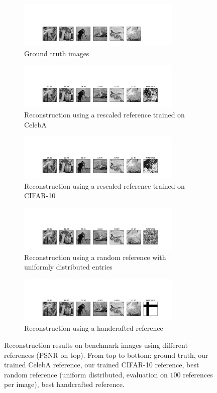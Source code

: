 \begin{figure}
	\begin{subfigure}{\textwidth}
		\centering
		\includegraphics[trim=270 35 270 200, width=7.8cm]{data/original-std.pdf}
		\caption{Ground truth images}
	\end{subfigure}
	\begin{subfigure}{\textwidth}
		\centering
		\includegraphics[trim=270 35 270 120, width=7.8cm]{data/rec-celeb-std.pdf}
		\caption{Reconstruction using a rescaled reference trained on CelebA}
	\end{subfigure}
	\begin{subfigure}{\textwidth}
		\centering
		\includegraphics[trim=270 35 270 120, width=7.8cm]{data/rec-cifar-std.pdf}
		\caption{Reconstruction using a rescaled reference trained on CIFAR-10}
	\end{subfigure}
	\begin{subfigure}{\textwidth}
		\centering
		\includegraphics[trim=270 35 270 120, width=7.8cm]{data/rec-random-std.pdf}
		\caption{Reconstruction using a random reference with uniformly distributed entries}
	\end{subfigure}
	\begin{subfigure}{\textwidth}
		\centering
		\includegraphics[trim=270 35 270 120, width=7.8cm]{data/rec-geometric-std.pdf}
		\caption{Reconstruction using a handcrafted reference }
	\end{subfigure}
	\caption{Reconstruction results on benchmark images using different references (PSNR on top). From top to bottom: ground truth, our trained CelebA reference, our trained CIFAR-10 reference,  best random reference (uniform distributed, evaluation on $100$ references per image), best handcrafted reference.}
	\label{images}
\end{figure}

